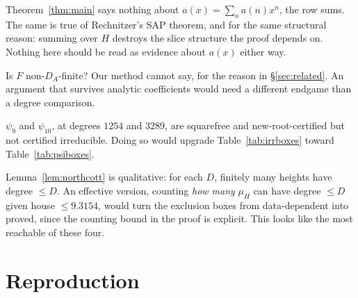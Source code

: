 \documentclass[11pt]{article}
\newcommand{\Q}{\mathbb{Q}}
\begin{document}
\begin{openproblem}
Theorem~\ref{thm:main} says nothing about $a(x) = \sum_n a(n)x^n$, the row sums.
The same is true of Rechnitzer's SAP theorem, and for the same structural reason:
summing over $H$ destroys the slice structure the proof depends on. Nothing here
should be read as evidence about $a(x)$ either way.
\end{openproblem}

\begin{openproblem}[extend past $\Q(x)$]
Is $F$ non-$D_A$-finite? Our method cannot say, for the reason in
\S\ref{sec:related}. An argument that survives analytic coefficients would need
a different endgame than a degree comparison.
\end{openproblem}

\begin{openproblem}
$\psi_9$ and $\psi_{10}$, at degrees $1254$ and $3289$, are squarefree and
new-root-certified but not certified irreducible. Doing so would upgrade
Table~\ref{tab:irrboxes} toward Table~\ref{tab:psiboxes}.
\end{openproblem}

\begin{openproblem}
Lemma~\ref{lem:northcott} is qualitative: for each $D$, finitely many heights
have degree $\le D$. An effective version, counting \emph{how many} $\mu_H$ can
have degree $\le D$ given house $\le 9.3154$, would turn the exclusion boxes from
data-dependent into proved, since the counting bound in the proof is explicit.
This looks like the most reachable of these four.
\end{openproblem}

\section{Reproduction}
\label{sec:repro}
\end{document}
